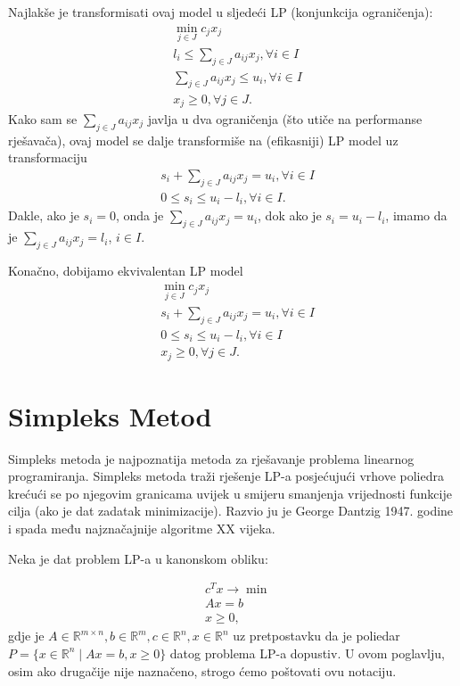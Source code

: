 \documentclass[a4paper, utf8, 11pt, colorlinks]{book}
\begin{document}
Najlakše je transformisati ovaj model u sljedeći LP (konjunkcija ograničenja): 
\begin{align*}
	& \min_{j \in J } c_j x_j \\
	&  l_i \leq \sum_{j \in J} a_{ij} x_j, \forall i\in I \\
	&  \sum_{j \in J} a_{ij} x_j \leq u_i, \forall i\in I \\
	&  x_j \geq 0, \forall j \in J.
\end{align*}
Kako sam se $\sum_{j \in J} a_{ij} x_j$ javlja u dva ograničenja (što utiče na performanse rješavača), ovaj model se dalje transformiše na (efikasniji) LP model uz transformaciju
\begin{align*}
	&s_i + \sum_{j \in J} a_{ij} x_j = u_i, \forall i \in I \\
	& 0 \leq s_i \leq  u_i - l_i, \forall i \in I.
\end{align*}
Dakle, ako je $s_i = 0$, onda je  $\sum_{j \in J} a_{ij} x_j = u_i$, dok ako je  $s_i = u_i - l_i$, imamo da je $\sum_{j \in J} a_{ij} x_j = l_i$, $i\in I$. 

Konačno, dobijamo ekvivalentan LP model
\begin{align*}
	&\min_{j \in J } c_j x_j \\
	&s_i + \sum_{j \in J} a_{ij} x_j = u_i, \forall i \in I \\ 
	&  0 \leq s_i \leq  u_i - l_i, \forall i \in I \\
	& x_j \geq 0, \forall j \in J.
\end{align*}

\newpage 
\chapter{Simpleks Metod}

Simpleks metoda je najpoznatija metoda za rješavanje problema linearnog programiranja. Simpleks metoda traži rješenje LP-a posjećujući vrhove poliedra krećući se po njegovim granicama  uvijek u smijeru smanjenja vrijednosti
funkcije cilja (ako je dat zadatak minimizacije). Razvio ju je George Dantzig 1947. godine i spada među najznačajnije algoritme XX vijeka.

Neka je dat problem LP-a u kanonskom obliku:

\begin{align}
    &c^Tx \rightarrow \min \nonumber \\ 
    & A x = b \nonumber \\
     & x \geq 0, \label{eq:lp_equality_constraint}
\end{align}
gdje je $A \in \mathbb{R}^{m \times n}, b \in \mathbb{R}^m, c \in \mathbb{R}^n, x\in \mathbb{R}^n$ uz pretpostavku da je poliedar $P=\{ x \in \mathbb{R}^n \mid A x = b , x \geq 0 \}$ datog problema LP-a dopustiv.  U ovom poglavlju, osim ako drugačije nije naznačeno, strogo ćemo poštovati ovu notaciju. 
\end{document}
